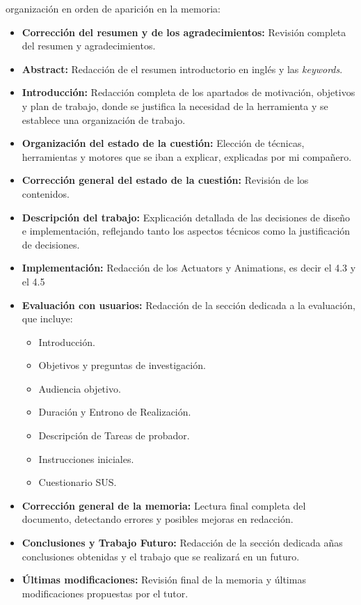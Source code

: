 organización en orden de aparición en la memoria:
\begin{itemize}
  \item \textbf{Corrección del resumen y de los agradecimientos:} Revisión completa del resumen y agradecimientos.
  \item \textbf{Abstract:} Redacción de el resumen introductorio en inglés y las \textit{keywords}.
  \item \textbf{Introducción:} Redacción completa de los apartados de motivación, objetivos y plan de trabajo, donde se justifica la necesidad de la herramienta y se establece una organización de trabajo.
  \item \textbf{Organización del estado de la cuestión:} Elección de técnicas, herramientas y motores que se iban a explicar, explicadas por mi compañero.
  \item \textbf{Corrección general del estado de la cuestión:} Revisión de los contenidos.
  \item \textbf{Descripción del trabajo:} Explicación detallada de las decisiones de diseño e implementación, reflejando tanto los aspectos técnicos como la justificación de decisiones.
  \item \textbf{Implementación:} Redacción de los Actuators y Animations, es decir el 4.3 y el 4.5
  \item \textbf{Evaluación con usuarios:} Redacción de la sección dedicada a la evaluación, que incluye:
  \begin{itemize}
    \item Introducción.
    \item Objetivos y preguntas de investigación.
    \item Audiencia objetivo.
    \item Duración y Entrono de Realización.
    \item Descripción de Tareas de probador.
    \item Instrucciones iniciales.
    \item Cuestionario SUS.
  \end{itemize}

  \item \textbf{Corrección general de la memoria:} Lectura final completa del documento, detectando errores  y posibles mejoras en redacción.
  \item \textbf{Conclusiones y Trabajo Futuro:} Redacción de la sección dedicada añas conclusiones obtenidas y el trabajo que se realizará en un futuro.
\item \textbf{ Últimas modificaciones:} Revisión final de la memoria y últimas modificaciones propuestas por el tutor.
\end{itemize}

